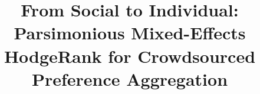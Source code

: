 \documentclass[10pt,journal,cspaper,compsoc]{IEEEtran}
\begin{document}
%
\title{From Social to Individual: Parsimonious Mixed-Effects HodgeRank for Crowdsourced Preference Aggregation}
%
%
%
%
%
%
\end{document}
